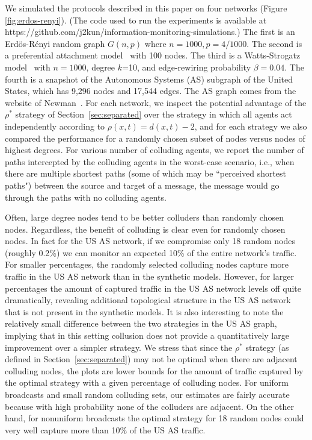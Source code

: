 \documentclass[reprint]{revtex4-1}
\begin{document}
We simulated the protocols described in this paper on four networks (Figure \ref{fig:erdos-renyi}). (The code used to run the experiments is available at https://github.com/j2kun/information-monitoring-simulations.) The first is an Erd\"os-R\'enyi random graph $G(n, p)$ where $n = 1000, p = 4/1000$. The second is a preferential attachment model~\cite{BarabasiA99} with 100 nodes. The third is a Watts-Strogatz model~\cite{WattsS98} with $n=1000$, degree $k$=10, and edge-rewiring probability $\beta=0.04$. The fourth is a snapshot of the Autonomous Systems (AS) subgraph of the United States, which has 9,296 nodes and 17,544 edges. The AS graph comes from the website of Newman~\cite{Newman06}. For each network, we inspect the potential advantage of the $\rho^*$ strategy of Section~\ref{sec:separated} over the strategy in which all agents act independently according to $\rho(x,t) = d(x,t) - 2$, and for each strategy we also compared the performance for a randomly chosen subset of nodes versus nodes of highest degrees. For various number of colluding agents, we report the number of paths intercepted by the colluding agents in the worst-case scenario, i.e., when there are multiple  shortest paths (some of which may be ``perceived shortest paths") between the source and target of a message, the message would go through the paths with no colluding agents.

Often, large degree nodes tend to be better colluders than randomly chosen
nodes. Regardless, the benefit of colluding is clear even for randomly chosen
nodes. In fact for the US AS network, if we compromise only 18 random nodes
(roughly 0.2\%) we can monitor an expected 10\% of the entire network's
traffic. For smaller percentages, the randomly selected colluding nodes capture
more traffic in the US AS network than in the synthetic models. However, for
larger percentages the amount of captured traffic in the US AS network levels
off quite dramatically, revealing additional topological structure in the US AS
network that is not present in the synthetic models. It is also interesting to
note the relatively small difference between the two strategies in the US AS
graph, implying that in this setting collusion does not provide a
quantitatively large improvement over a simpler strategy. We stress that since
the $\rho^*$ strategy (as defined in Section~\ref{sec:separated}) may not be
optimal when there are adjacent colluding nodes, the plots are lower bounds for
the amount of traffic captured by the optimal strategy with a given percentage
of colluding nodes. For uniform broadcasts and small random colluding sets, our
estimates are fairly accurate because with high probability none of the
colluders are adjacent. On the other hand, for nonuniform broadcasts the
optimal strategy for 18 random nodes could very well capture more than 10\% of
the US AS traffic.
\end{document}
